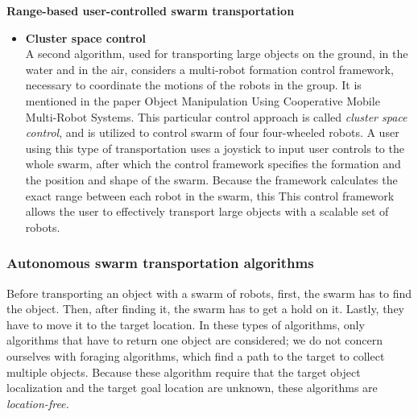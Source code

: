 \textbf{Range-based user-controlled swarm transportation}
\begin{itemize} 
\item \textbf{Cluster space control}\\
A second algorithm, used for transporting large objects on the ground, in the water and in the air, considers a multi-robot formation control framework, necessary to coordinate the motions of the robots in the group. 
It is mentioned in the paper Object Manipulation Using Cooperative Mobile Multi-Robot Systems. \cite{Mas2012}
This particular control approach is called \emph{cluster space control}, and is utilized to control swarm of four four-wheeled robots. 
A user using this type of transportation uses a joystick to input user controls to the whole swarm, after which the control framework specifies the formation and the position and shape of the swarm.
Because the framework calculates the exact range between each robot in the swarm, this 
This control framework allows the user to effectively transport large objects with a scalable set of robots. \\
\end{itemize}

\subsubsection{Autonomous swarm transportation algorithms}
Before transporting an object with a swarm of robots, first, the swarm has to find the object. Then, after finding it, the swarm has to get a hold on it. Lastly, they have to move it to the target location. In these types of algorithms, only algorithms that have to return one object are considered; we do not concern ourselves with foraging algorithms, which find  a path to the target to collect multiple objects. Because these algorithm require that the target object localization and the target goal location are unknown, these algorithms are\emph{ location-free.} \\

